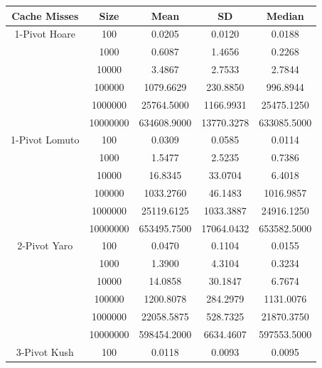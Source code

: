 \documentclass{article}
\begin{document}
\begin{center}
    \small
    \begin{tabular}{ |c c | c c c| }
        \hline
        Cache Misses    & Size     & Mean           & SD            & Median \\
        \hline
        1-Pivot Hoare   & 100      & 0.0205         & 0.0120        & 0.0188 \\
                        & 1000     & 0.6087         & 1.4656        & 0.2268 \\
                        & 10000    & 3.4867         & 2.7533        & 2.7844 \\
                        & 100000   & 1079.6629      & 230.8850      & 996.8944 \\
                        & 1000000  & 25764.5000     & 1166.9931     & 25475.1250 \\
                        & 10000000 & 634608.9000    & 13770.3278    & 633085.5000 \\
        \hline
        1-Pivot Lomuto  & 100      & 0.0309         & 0.0585        & 0.0114 \\
                        & 1000     & 1.5477         & 2.5235        & 0.7386 \\
                        & 10000    & 16.8345        & 33.0704       & 6.4018 \\
                        & 100000   & 1033.2760      & 46.1483       & 1016.9857 \\
                        & 1000000  & 25119.6125     & 1033.3887     & 24916.1250 \\
                        & 10000000 & 653495.7500    & 17064.0432    & 653582.5000 \\
        \hline
        2-Pivot Yaro    & 100      & 0.0470         & 0.1104        & 0.0155 \\
                        & 1000     & 1.3900         & 4.3104        & 0.3234 \\
                        & 10000    & 14.0858        & 30.1847       & 6.7674 \\
                        & 100000   & 1200.8078      & 284.2979      & 1131.0076 \\
                        & 1000000  & 22058.5875     & 528.7325      & 21870.3750 \\
                        & 10000000 & 598454.2000    & 6634.4607     & 597553.5000 \\
        \hline
        3-Pivot Kush    & 100      & 0.0118         & 0.0093        & 0.0095 \\

\end{tabular}
\end{center}
\end{document}
